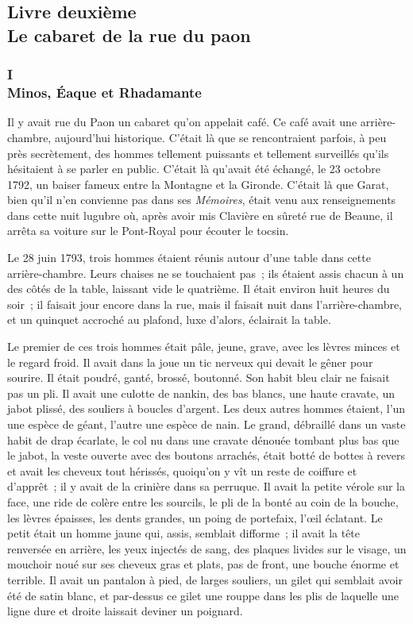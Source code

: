 \documentclass[french,twoside]{book} %
\begin{document}
  \subsection[{Livre deuxième. Le cabaret de la rue du paon}]{Livre deuxième \\
Le cabaret de la rue du paon}
\label{p2l2}
\subsubsection[{I. Minos, Éaque et Rhadamante}]{I \\
Minos, Éaque et Rhadamante}
\label{p2l2c1}
\noindent Il y avait rue du Paon un cabaret qu’on appelait café. Ce café avait une arrière-chambre, aujourd’hui historique. C’était là que se rencontraient parfois, à peu près secrètement, des hommes tellement puissants et tellement surveillés qu’ils hésitaient à se parler en public. C’était là qu’avait été échangé, le 23 octobre 1792, un baiser fameux entre la Montagne et la Gironde. C’était là que Garat, bien qu’il n’en convienne pas dans ses \emph{Mémoires}, était venu aux renseignements dans cette nuit lugubre où, après avoir mis Clavière en sûreté rue de Beaune, il arrêta sa voiture sur le Pont-Royal pour écouter le tocsin.\par
 Le 28 juin 1793, trois hommes étaient réunis autour d’une table dans cette arrière-chambre. Leurs chaises ne se touchaient pas ; ils étaient assis chacun à un des côtés de la table, laissant vide le quatrième. Il était environ huit heures du soir ; il faisait jour encore dans la rue, mais il faisait nuit dans l’arrière-chambre, et un quinquet accroché au plafond, luxe d’alors, éclairait la table.\par
Le premier de ces trois hommes était pâle, jeune, grave, avec les lèvres minces et le regard froid. Il avait dans la joue un tic nerveux qui devait le gêner pour sourire. Il était poudré, ganté, brossé, boutonné. Son habit bleu clair ne faisait pas un pli. Il avait une culotte de nankin, des bas blancs, une haute cravate, un jabot plissé, des souliers à boucles d’argent. Les deux autres hommes étaient, l’un une espèce de géant, l’autre une espèce de nain. Le grand, débraillé dans un vaste habit de drap écarlate, le col nu dans une cravate dénouée tombant plus bas que le jabot, la veste ouverte avec des boutons arrachés, était botté de bottes à revers et avait les cheveux tout hérissés, quoiqu’on y vît un reste de coiffure et d’apprêt ; il y avait de la crinière dans sa perruque. Il avait la petite vérole sur la face, une ride de colère entre les sourcils, le pli de la bonté au coin de la bouche, les lèvres épaisses, les dents grandes, un poing de portefaix, l’œil éclatant. Le petit était un homme jaune qui, assis, semblait difforme ; il avait la tête renversée en arrière, les yeux injectés de sang, des plaques livides sur le visage, un mouchoir noué sur ses cheveux gras  et plats, pas de front, une bouche énorme et terrible. Il avait un pantalon à pied, de larges souliers, un gilet qui semblait avoir été de satin blanc, et par-dessus ce gilet une rouppe dans les plis de laquelle une ligne dure et droite laissait deviner un poignard.\par
\end{document}
